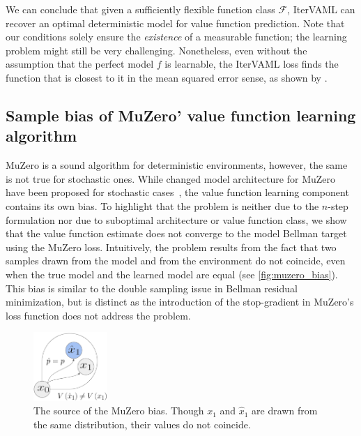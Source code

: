 We can conclude that given a sufficiently flexible function class $\mathcal{F}$, IterVAML can recover an optimal deterministic model for value function prediction.
Note that our conditions solely ensure the \emph{existence} of a measurable function; the learning problem might still be very challenging.
Nonetheless, even without the assumption that the perfect model $f$ is learnable, the IterVAML loss finds the function that is closest to it in the mean squared error sense, as shown by \textcite{itervaml}.

\subsection{Sample bias of MuZero' value function learning algorithm}
\label{sec:muzero_bias}


MuZero is a sound algorithm for deterministic environments, however, the same is not true for stochastic ones.
While changed model architecture for MuZero have been proposed for stochastic cases~\parencite{antonoglou2022planning}, the value function learning component contains its own bias.
To highlight that the problem is neither due to the $n$-step formulation nor due to suboptimal architecture or value function class, we show that the value function estimate does not converge to the model Bellman target using the MuZero loss.
Intuitively, the problem results from the fact that two samples drawn from the model and from the environment do not coincide, even when the true model and the learned model are equal (see \autoref{fig:muzero_bias}).
This bias is similar to the double sampling issue in Bellman residual minimization, but is distinct as the introduction of the stop-gradient in MuZero's loss function does not address the problem.


\begin{figure}
  \begin{center}
    \includegraphics[width=0.25\textwidth]{illustrations/lambda/muzero_bias.png}
  \end{center}
  \caption{The source of the MuZero bias. Though $x_1$ and $\hat{x}_1$ are drawn from the same distribution, their values do not coincide.}
  \label{fig:muzero_bias}
\end{figure}


